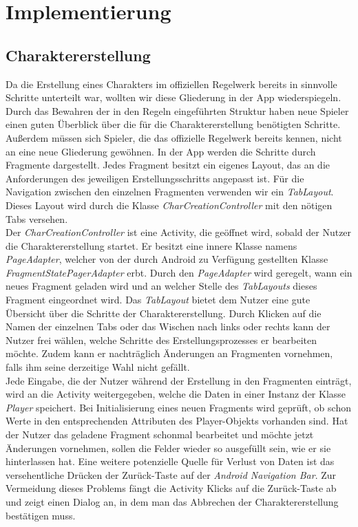 \newpage
\section{Implementierung}

\subsection{Charaktererstellung}
Da die Erstellung eines Charakters im offiziellen Regelwerk bereits in sinnvolle Schritte unterteilt war, wollten wir diese Gliederung in der App wiederspiegeln. Durch das Bewahren der in den Regeln eingeführten Struktur haben neue Spieler einen guten Überblick über die für die Charaktererstellung benötigten Schritte. Außerdem müssen sich Spieler, die das offizielle Regelwerk bereits kennen, nicht an eine neue Gliederung gewöhnen. In der App werden die Schritte durch Fragmente dargestellt. Jedes Fragment besitzt ein eigenes Layout, das an die Anforderungen des jeweiligen Erstellungsschritts angepasst ist. Für die Navigation zwischen den einzelnen Fragmenten verwenden wir ein \textit{TabLayout}. Dieses Layout wird durch die Klasse \textit{CharCreationController} mit den nötigen Tabs versehen.\\

Der \textit{CharCreationController} ist eine Activity, die geöffnet wird, sobald der Nutzer die Charaktererstellung startet. Er besitzt eine innere Klasse namens \textit{PageAdapter}, welcher von der durch Android zu Verfügung gestellten Klasse \textit{FragmentStatePagerAdapter} erbt. Durch den \textit{PageAdapter} wird geregelt, wann ein neues Fragment geladen wird und an welcher Stelle des \textit{TabLayouts} dieses Fragment eingeordnet wird. Das \textit{TabLayout} bietet dem Nutzer eine gute Übersicht über die Schritte der Charaktererstellung. Durch Klicken auf die Namen der einzelnen Tabs oder das Wischen nach links oder rechts kann der Nutzer frei wählen, welche Schritte des Erstellungsprozesses er bearbeiten möchte. Zudem kann er nachträglich Änderungen an Fragmenten vornehmen, falls ihm seine derzeitige Wahl nicht gefällt.\\

Jede Eingabe, die der Nutzer während der Erstellung in den Fragmenten einträgt, wird an die Activity weitergegeben, welche die Daten in einer Instanz der Klasse \textit{Player} speichert. Bei Initialisierung eines neuen Fragments wird geprüft, ob schon Werte in den entsprechenden Attributen des Player-Objekts vorhanden sind. Hat der Nutzer das geladene Fragment schonmal bearbeitet und möchte jetzt Änderungen vornehmen, sollen die Felder wieder so ausgefüllt sein, wie er sie hinterlassen hat. Eine weitere potenzielle Quelle für Verlust von Daten ist das versehentliche Drücken der Zurück-Taste auf der \textit{Android Navigation Bar}. Zur Vermeidung dieses Problems fängt die Activity Klicks auf die Zurück-Taste ab und zeigt einen Dialog an, in dem man das Abbrechen der Charaktererstellung bestätigen muss.\\


